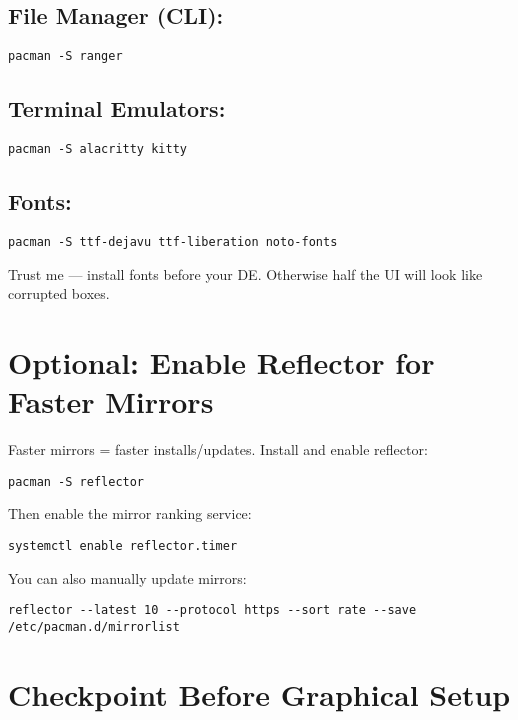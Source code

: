 \documentclass[12pt]{book}
\begin{document}
\subsection*{File Manager (CLI):}

\begin{lstlisting}
pacman -S ranger
\end{lstlisting}

\subsection*{Terminal Emulators:}

\begin{lstlisting}
pacman -S alacritty kitty
\end{lstlisting}

\subsection*{Fonts:}

\begin{lstlisting}
pacman -S ttf-dejavu ttf-liberation noto-fonts
\end{lstlisting}

Trust me — install fonts before your DE. Otherwise half the UI will look like corrupted boxes.

\section{Optional: Enable Reflector for Faster Mirrors}

Faster mirrors = faster installs/updates. Install and enable reflector:

\begin{lstlisting}
pacman -S reflector
\end{lstlisting}

Then enable the mirror ranking service:

\begin{lstlisting}
systemctl enable reflector.timer
\end{lstlisting}

You can also manually update mirrors:

\begin{lstlisting}
reflector --latest 10 --protocol https --sort rate --save /etc/pacman.d/mirrorlist
\end{lstlisting}

\section{Checkpoint Before Graphical Setup}
\end{document}
